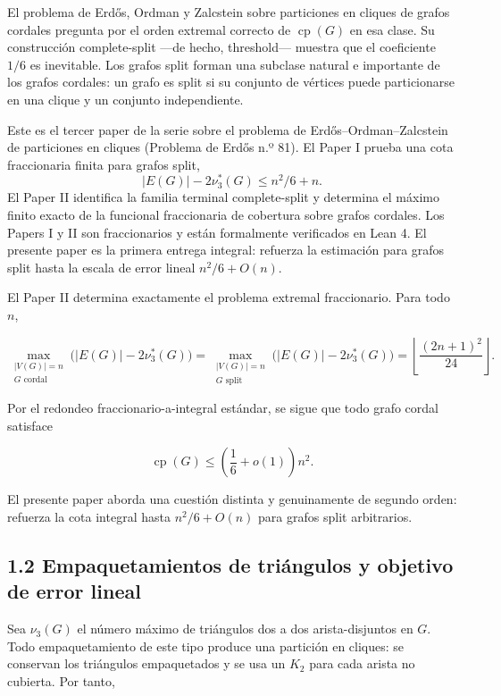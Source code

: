 \documentclass[
  11pt,
]{article}
\begin{document}
El problema de Erdős, Ordman y Zalcstein sobre particiones en cliques de
grafos cordales pregunta por el orden extremal correcto de
\(\operatorname{cp}(G)\) en esa clase. Su construcción complete-split
---de hecho, threshold--- muestra que el coeficiente \(1/6\) es
inevitable. Los grafos split forman una subclase natural e importante de
los grafos cordales: un grafo es split si su conjunto de vértices puede
particionarse en una clique y un conjunto independiente.

Este es el tercer paper de la serie sobre el problema de
Erdős--Ordman--Zalcstein de particiones en cliques (Problema de Erdős
n.º 81). El Paper I prueba una cota fraccionaria finita para grafos
split, \[
|E(G)|-2\nu_3^*(G)\le n^2/6+n.
\] El Paper II identifica la familia terminal complete-split y determina
el máximo finito exacto de la funcional fraccionaria de cobertura sobre
grafos cordales. Los Papers I y II son fraccionarios y están formalmente
verificados en Lean 4. El presente paper es la primera entrega integral:
refuerza la estimación para grafos split hasta la escala de error lineal
\(n^2/6+O(n)\).

El Paper II determina exactamente el problema extremal fraccionario.
Para todo \(n\),

\[
\max_{\substack{|V(G)|=n\\G\text{ cordal}}}
\bigl(|E(G)|-2\nu_3^*(G)\bigr)
=
\max_{\substack{|V(G)|=n\\G\text{ split}}}
\bigl(|E(G)|-2\nu_3^*(G)\bigr)
=
\left\lfloor\frac{(2n+1)^2}{24}\right\rfloor.
\]

Por el redondeo fraccionario-a-integral estándar, se sigue que todo
grafo cordal satisface

\[
\operatorname{cp}(G)
\le
\left(\frac16+o(1)\right)n^2.
\]

El presente paper aborda una cuestión distinta y genuinamente de segundo
orden: refuerza la cota integral hasta \(n^2/6+O(n)\) para grafos split
arbitrarios.

\subsection{1.2 Empaquetamientos de triángulos y objetivo de error
lineal}\label{empaquetamientos-de-triuxe1ngulos-y-objetivo-de-error-lineal}

Sea \(\nu_3(G)\) el número máximo de triángulos dos a dos
arista-disjuntos en \(G\). Todo empaquetamiento de este tipo produce una
partición en cliques: se conservan los triángulos empaquetados y se usa
un \(K_2\) para cada arista no cubierta. Por tanto,
\end{document}
